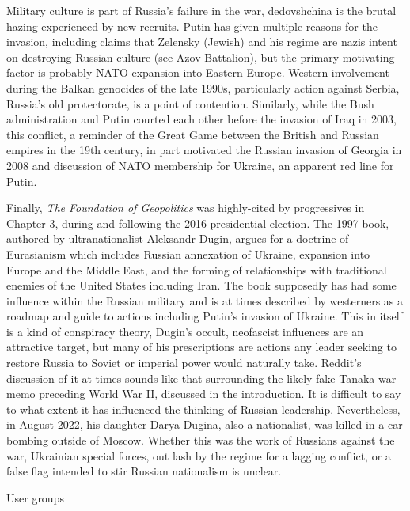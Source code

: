 \documentclass[doublespacing]{utdthesis}
\begin{document}
Military culture is part of Russia's failure in the war, dedovshchina is the brutal hazing experienced by new recruits.
Putin has given multiple reasons for the invasion, including claims that Zelensky (Jewish) and his regime are nazis intent on destroying Russian culture (see Azov Battalion), but the primary motivating factor is probably NATO expansion into Eastern Europe.
Western involvement during the Balkan genocides of the late 1990s, particularly action against Serbia, Russia's old protectorate, is a point of contention.
Similarly, while the Bush administration and Putin courted each other before the invasion of Iraq in 2003, this conflict, a reminder of the Great Game between the British and Russian empires in the 19th century, in part motivated the Russian invasion of Georgia in 2008 and discussion of NATO membership for Ukraine, an apparent red line for Putin.

Finally, \emph{The Foundation of Geopolitics} was highly-cited by progressives in Chapter 3, during and following the 2016 presidential election.
The 1997 book, authored by ultranationalist Aleksandr Dugin, argues for a doctrine of Eurasianism which includes Russian annexation of Ukraine, expansion into Europe and the Middle East, and the forming of relationships with traditional enemies of the United States including Iran.
The book supposedly has had some influence within the Russian military and is at times described by westerners as a roadmap and guide to actions including Putin's invasion of Ukraine.
This in itself is a kind of conspiracy theory, Dugin's occult, neofascist influences are an attractive target, but many of his prescriptions are actions any leader seeking to restore Russia to Soviet or imperial power would naturally take.
Reddit's discussion of it at times sounds like that surrounding the likely fake Tanaka war memo preceding World War II, discussed in the introduction.
It is difficult to say to what extent it has influenced the thinking of Russian leadership.
Nevertheless, in August 2022, his daughter Darya Dugina, also a nationalist, was killed in a car bombing outside of Moscow.
Whether this was the work of Russians against the war, Ukrainian special forces, out lash by the regime for a lagging conflict, or a false flag intended to stir Russian nationalism is unclear. 

\begin{table}[h!]
\centering
\caption{User groups}

\label{tab:groups_2022}
\end{table}
\end{document}
